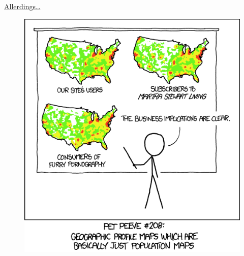 \documentclass[ignorenonframetext,]{beamer}
\begin{document}
\begin{frame}{\href{http://xkcd.com/1138/}{Allerdings\ldots{}}}

\begin{figure}
\centering
\includegraphics{figure/heatmapComic.png}
\caption{}
\end{figure}

\end{frame}
\end{document}
